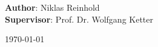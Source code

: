 \begin{titlepage}
	\large
	\textbf{Author}: Niklas Reinhold\\
	\large
	\textbf{Supervisor}: Prof. Dr. Wolfgang Ketter
	
	\vspace{2cm}


    {\large \today}\\[1cm] %

    \vfill  %
    

\end{titlepage}
